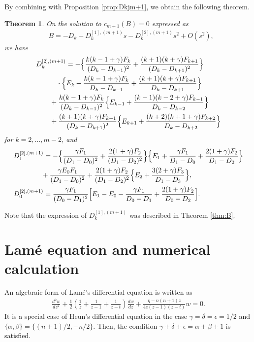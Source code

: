 \documentclass[12pt]{amsart}
\numberwithin{equation}{section}
\newtheorem{thm}{Theorem}[section]
\theoremstyle{definition}
\theoremstyle{remark}
\begin{document}
By combining with Proposition \ref{prop:Dkjm+1}, we obtain the following theorem.
\begin{thm} \label{thm:expa2}
On the solution to $c_{m+1}(B)= 0 $ expressed as
\begin{align}
& B = -D_{k} - D_k^{[1],(m+1)} s - D_k^{[2],(m+1)} s^2 + O(s^2), 
\end{align}
we have
\begin{align}
& D_k^{[2],(m+1)} =-  \Bigl\{ \frac{k(k-1+\gamma) F_{k} }{(D_{k}-D_{k-1})^2} + \frac{(k+1)(k+\gamma) F_{k+1}}{(D_{k}-D_{k+1})^2} \Bigr\} \\
& \quad \qquad \cdot \Bigl\{ E_{k} + \frac{k(k-1+\gamma) F_{k} }{D_{k}-D_{k-1}} + \frac{(k+1)(k+\gamma) F_{k+1}}{D_{k}-D_{k+1}} \Bigr\} \nonumber \\
& \quad \quad + \frac{k(k-1+\gamma) F_{k} }{(D_{k}-D_{k-1})^2} \Bigl\{ E_{k-1}+\frac{(k-1)(k-2+\gamma) F_{k-1}}{D_{k}-D_{k-2}} \Bigr\} \nonumber \\
& \quad \quad + \frac{(k+1)(k+\gamma) F_{k+1}}{(D_{k}-D_{k+1})^2} \Bigl\{ E_{k+1}+\frac{(k+2)(k+1+\gamma) F_{k+2}}{D_{k}-D_{k+2}} \Bigr\}  \nonumber 
\end{align}
for $k=2,\dots ,m-2$, and
\begin{align}
& D_1^{[2],(m+1)}=  - \Bigl\{ \frac{\gamma F_{1} }{(D_{1}-D_{0})^2} + \frac{2(1+\gamma) F_{2}}{(D_{1}-D_{2})^2} \Bigr\} \Bigl\{ E_{1} + \frac{\gamma F_{1} }{D_{1}-D_{0}} + \frac{2(1+\gamma) F_{2}}{D_{1}-D_{2}} \Bigr\} \\
& \qquad \qquad + \frac{\gamma E_{0} F_{1} }{(D_{1}-D_{0})^2} + \frac{2(1+\gamma) F_{2}}{(D_{1}-D_{2})^2} \Bigl\{ E_{2}+\frac{3(2+\gamma) F_{3}}{D_{1}-D_{3}} \Bigr\} , \nonumber \\
& D_0^{[2],(m+1)} = \frac{\gamma F_{1}}{(D_{0}-D_{1})^2} \Bigl[ E_{1} - E_{0} - \frac{\gamma F_{1}}{D_{0}-D_{1}} + \frac{2(1+\gamma) F_{2}}{D_{0}-D_{2}} \Bigr]  . 
\end{align}
\end{thm}
Note that the expression of $D_k^{[1],(m+1)}$ was described in Theorem \ref{thm:B}.

\section{Lam\'e equation and numerical calculation} \label{sec:Lame}

An algebraic form of Lam\'e's differential equation is written as
\begin{align}
  \frac{d^{2}w}{dz^{2}} +\frac{1}{2}\left( \frac{1}{z } +\frac{1}{z -1} +\frac{1}{z -t}\right)\frac{dw}{dz} +\frac{\eta -n(n +1)z}{4z (z -1)(z -t)}w= 0.
\end{align}
It is a special case of Heun's differential equation in the case $\gamma = \delta = \epsilon = 1/2 $ and $\{\alpha, \beta\}= \{ (n+1)/2 , -n/2 \}$.
Then, the condition $\gamma +\delta +\epsilon =\alpha +\beta +1 $ is satisfied.
\end{document}
